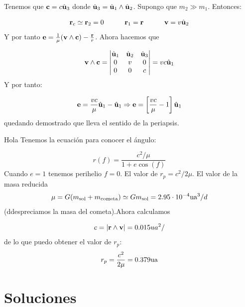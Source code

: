 \begin{texercise}
    Tenemos que $\mathbf{c}=c\hat{\mathbf{u}}_3$ donde $\hat{\mathbf{u}}_3=\hat{\mathbf{u}}_1\wedge\hat{\mathbf{u}}_2$. Supongo que $m_2\gg m_1$. Entonces:

    \begin{equation}
        \mathbf{r}_c \simeq \mathbf{r}_2 = 0 \quad \quad \quad \mathbf{r}_1 = \mathbf{r} \quad \quad \quad \mathbf{v} = v \hat{\mathbf{u}}_2
    \end{equation}
    Y por tanto $\mathbf{e}=\frac{1}{\mu} (\mathbf{v} \wedge \mathbf{c}) - \frac{\mathbf{r}}{r}$. Ahora hacemos que 

    \begin{equation}
        \mathbf{v} \wedge \mathbf{c} = \begin{vmatrix}
            \hat{\mathbf{u}}_1 & \hat{\mathbf{u}}_2 & \hat{\mathbf{u}}_3 \\
            0 & v & 0 \\
            0 & 0 & c
        \end{vmatrix} = v c \hat{\mathbf{u}}_1
    \end{equation}
    Y por tanto:

    \begin{equation}
        \mathbf{e} = \frac{vc}{\mu} \hat{\mathbf{u}}_1 - \hat{\mathbf{u}}_1 \Rightarrow \mathbf{e} = \left[ \frac{vc}{\mu}-1 \right]\hat{\mathbf{u}}_1
    \end{equation}
    quedando demostrado que lleva el sentido de la periapsis. 
\end{texercise}

\begin{texercise}
    Hola
    \tcblower
    Tenemos la ecuación para conocer el ángulo:

    \begin{equation}
        r(f) = \frac{c^2/ \mu}{1+e\cos(f)}
    \end{equation}
    Cuando $e=1$ tenemos perihelio $f=0$. El valor de $r_p = c^2/2\mu$. El valor de la masa reducida $$\mu=G(m_{\text{sol}}+m_{\text{cometa}})\simeq G m_{\text{sol}} = 2.95\cdot 10^{-4} \text{ua}^3/d$$(ddespreciamos la masa del cometa).Ahora calculamos 

    \begin{equation}
        c=|\rn\wedge\vn|=0.015 \*ua^2/
    \end{equation}
    de lo que puedo obtener el valor de $r_p$:
    \begin{equation}
        r_p = \frac{c^2}{2\mu} = 0.379 \text{ua}
    \end{equation}
\end{texercise}
\tcbstoprecording

\section{{Soluciones}}

\tcbinputrecords

